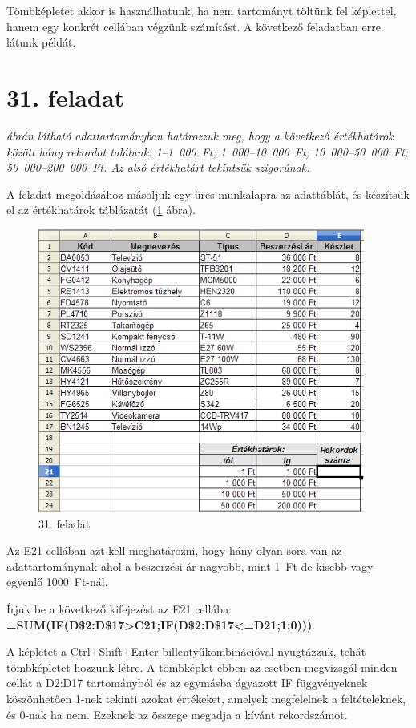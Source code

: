 Tömbképletet akkor is használhatunk, ha nem tartományt
töltünk fel képlettel, hanem egy konkrét cellában végzünk
számítást. A következő feladatban erre látunk példát.


\section{31. feladat}
{\itshape
{} ábrán látható adattartományban határozzuk meg,
hogy a következő értékhatárok között hány rekordot
találunk: 1--1~000~Ft; 1~000--10~000~Ft; 10~000--50~000~Ft;
50~000--200~000~Ft. Az alsó értékhatárt tekintsük szigorúnak.}

A feladat megoldásához másoljuk egy üres munkalapra az
adattáblát, és készítsük el az értékhatárok
táblázatát (\ref{31-feladat} ábra). 

\begin{figure}[!h]
\begin{center}
\includegraphics[width=10.73cm]{oocalcv1-img138.png}
\caption{31. feladat}\label{31-feladat}
\end{center}
\end{figure}

Az E21 cellában azt kell meghatározni, hogy hány olyan sora van az
adattartománynak ahol a beszerzési ár nagyobb, mint 1~Ft de
kisebb vagy egyenlő 1000~Ft-nál.

Írjuk be a következő kifejezést az E21 cellába:\\
{\sffamily\bfseries{=SUM(IF(D\$2:D\$17>C21;IF(D\$2:D\$17<=D21;1;0)))}}.

A képletet a Ctrl+Shift+Enter billentyűkombinációval
nyugtázzuk, tehát tömbképletet hozzunk létre. A
tömbképlet ebben az esetben megvizsgál minden cellát a D2:D17
tartományból és az egymásba ágyazott IF függvényeknek
köszönhetően 1-nek tekinti azokat értékeket, amelyek
megfelelnek a feltételeknek, és 0-nak ha nem. Ezeknek az összege
megadja a kívánt rekordszámot.

